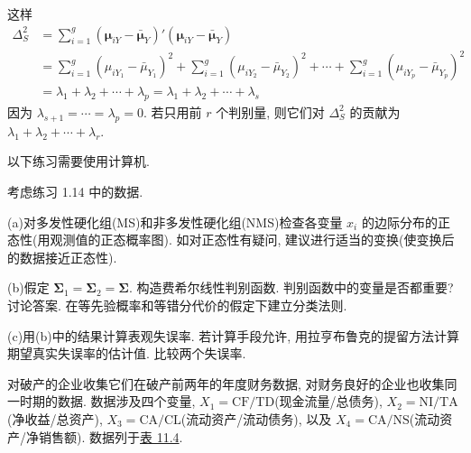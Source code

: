 
这样
\[
\begin{aligned}
\Delta_S^2&=\sum_{i=1}^{g}(\boldsymbol{\mu}_{iY}-\bar{\boldsymbol{\mu}}_Y)'(\boldsymbol{\mu}_{iY}-\bar{\boldsymbol{\mu}}_Y)\\
&=\sum_{i=1}^{g}(\mu_{iY_1}-\bar{\mu}_{Y_1})^2+\sum_{i=1}^{g}(\mu_{iY_2}-\bar{\mu}_{Y_2})^2+\cdots+\sum_{i=1}^{g}(\mu_{iY_p}-\bar{\mu}_{Y_p})^2\\
&=\lambda_1+\lambda_2+\cdots+\lambda_p=\lambda_1+\lambda_2+\cdots+\lambda_s
\end{aligned}
\]
因为 $\lambda_{s+1}=\cdots=\lambda_p=0$. 若只用前 $r$ 个判别量, 则它们对 $\Delta_S^2$ 的贡献为 $\lambda_1+\lambda_2+\cdots+\lambda_r$.

以下练习需要使用计算机.

\quad 考虑练习 1.14 中的数据.

\noindent (a)\quad 对多发性硬化组(MS)和非多发性硬化组(NMS)检查各变量 $x_i$ 的边际分布的正态性(用观测值的正态概率图). 如对正态性有疑问, 建议进行适当的变换(使变换后的数据接近正态性).

\noindent (b)\quad 假定 $\boldsymbol{\Sigma}_1=\boldsymbol{\Sigma}_2=\boldsymbol{\Sigma}$. 构造费希尔线性判别函数. 判别函数中的变量是否都重要? 讨论答案. 在等先验概率和等错分代价的假定下建立分类法则.

\noindent (c)\quad 用(b)中的结果计算表观失误率. 若计算手段允许, 用拉亨布鲁克的提留方法计算期望真实失误率的估计值. 比较两个失误率.

\quad 对破产的企业收集它们在破产前两年的年度财务数据, 对财务良好的企业也收集同一时期的数据. 数据涉及四个变量, $X_1=\mathrm{CF}/\mathrm{TD}$(现金流量/总债务), $X_2=\mathrm{NI}/\mathrm{TA}$(净收益/总资产), $X_3=\mathrm{CA}/\mathrm{CL}$(流动资产/流动债务), 以及 $X_4=\mathrm{CA}/\mathrm{NS}$(流动资产/净销售额). 数据列于\hyperref[tab:11.4]{表 11.4}.

